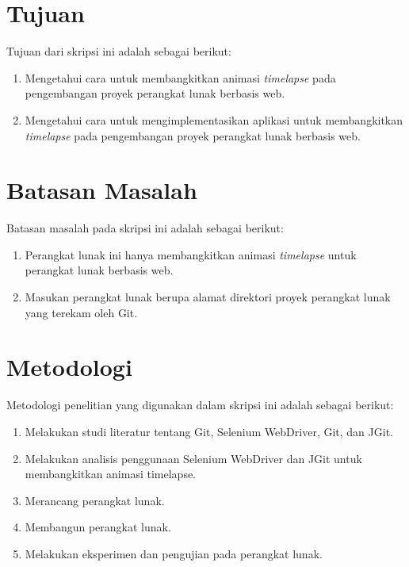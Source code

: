 \section{Tujuan}
\label{sec:tujuan}
Tujuan dari skripsi ini adalah sebagai berikut:
\begin{enumerate}
	\item Mengetahui cara untuk membangkitkan animasi \textit{timelapse} pada pengembangan proyek perangkat lunak berbasis web.
	\item Mengetahui cara untuk mengimplementasikan aplikasi untuk membangkitkan \textit{timelapse} pada pengembangan proyek perangkat lunak berbasis web.
\end{enumerate}

\section{Batasan Masalah}
\label{sec:batasan}
Batasan masalah pada skripsi ini adalah sebagai berikut:
\begin{enumerate}
		\item Perangkat lunak ini hanya membangkitkan animasi \textit{timelapse} untuk perangkat lunak berbasis web. 
		\item Masukan perangkat lunak berupa alamat direktori proyek perangkat lunak yang terekam oleh Git.
	\end{enumerate}

\section{Metodologi}
\label{sec:metlit}
Metodologi penelitian yang digunakan dalam skripsi ini adalah sebagai berikut:
\begin{enumerate}
		\item Melakukan studi literatur tentang Git, Selenium WebDriver, Git, dan JGit.
		\item Melakukan analisis penggunaan Selenium WebDriver dan JGit untuk membangkitkan animasi timelapse.
		\item Merancang perangkat lunak.
		\item Membangun perangkat lunak.
		\item Melakukan eksperimen dan pengujian pada perangkat lunak.
	\end{enumerate}

